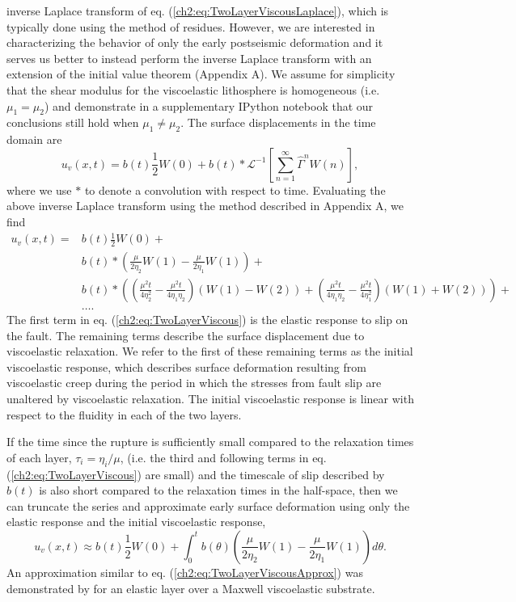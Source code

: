 inverse Laplace transform of eq. (\ref{ch2:eq:TwoLayerViscousLaplace}), which
is typically done using the method of residues. However, we are
interested in characterizing the behavior of only the early
postseismic deformation and it serves us better to instead perform the
inverse Laplace transform with an extension of the initial value
theorem (Appendix A). We assume for simplicity that the shear modulus
for the viscoelastic lithosphere is homogeneous (i.e. $\mu_1 = \mu_2$)
and demonstrate in a supplementary IPython notebook that our
conclusions still hold when $\mu_1 \neq \mu_2$.  The surface
displacements in the time domain are
\begin{equation}
u_v(x,t) = b(t)\frac{1}{2}W(0) + 
           b(t)\ast\mathcal{L}^{-1}\left[\sum_{n=1}^\infty\hat{\Gamma}^{n}W(n)\right],
\end{equation}
where we use $*$ to denote a convolution with respect to time.
Evaluating the above inverse Laplace transform using the method
described in Appendix A, we find
\begin{align}\label{ch2:eq:TwoLayerViscous}
u_v(x,t) = &b(t)\frac{1}{2}W(0) +\nonumber\\
           &b(t)\ast\left(\frac{\mu}{2\eta_2}W(1) - \frac{\mu}{2\eta_1}W(1)\right) +\nonumber\\
           &b(t)\ast\left(\left(\frac{\mu^2t}{4\eta_2^2} -
                \frac{\mu^2t}{4\eta_1\eta_2}\right) \left(W(1) - W(2)\right) +
                \left(\frac{\mu^2t}{4\eta_1\eta_2} - \frac{\mu^2t}{4\eta_1^2}\right)
                \left(W(1) + W(2)\right)\right) + \nonumber\\ 
           &\dots.
\end{align}
The first term in eq. (\ref{ch2:eq:TwoLayerViscous}) is the elastic response
to slip on the fault.  The remaining terms describe the surface
displacement due to viscoelastic relaxation.  We refer to the first of
these remaining terms as the initial viscoelastic response, which
describes surface deformation resulting from viscoelastic creep during
the period in which the stresses from fault slip are unaltered by
viscoelastic relaxation.  The initial viscoelastic response is linear
with respect to the fluidity in each of the two layers.

If the time since the rupture is sufficiently small compared to the
relaxation times of each layer, $\tau_i=\eta_i/\mu$, (i.e. the third
and following terms in eq. (\ref{ch2:eq:TwoLayerViscous}) are small) and the
timescale of slip described by $b(t)$ is also short compared to the
relaxation times in the half-space, then we can truncate the series and
approximate early surface deformation using only the elastic response
and the initial viscoelastic response,
\begin{equation}\label{ch2:eq:TwoLayerViscousApprox}
u_v(x,t) \approx b(t)\frac{1}{2}W(0) + 
                 \int_0^t b(\theta)\left(\frac{\mu}{2\eta_2}W(1) - 
                 \frac{\mu}{2\eta_1}W(1)\right)d\theta.
\end{equation} 
An approximation similar to eq. (\ref{ch2:eq:TwoLayerViscousApprox}) was
demonstrated by \citet{Segall2010} for an elastic layer over a Maxwell
viscoelastic substrate. 

